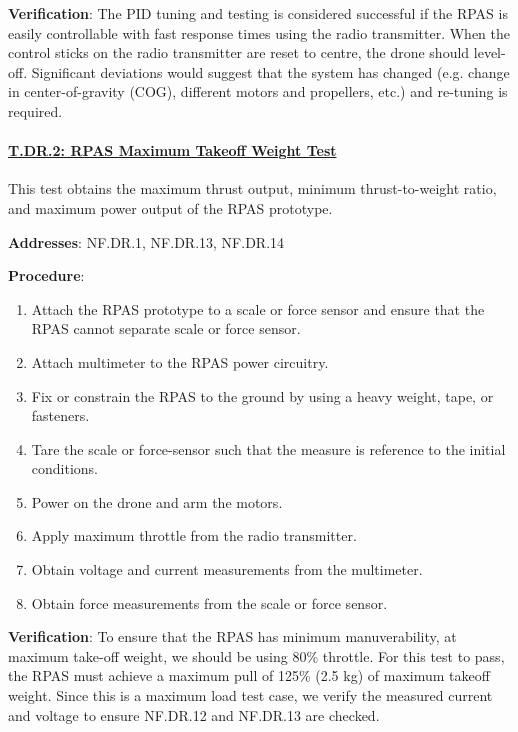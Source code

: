 \textbf{Verification}: The PID tuning and testing is considered successful if the RPAS is easily controllable with fast response times using the radio transmitter. When the control sticks on the radio transmitter are reset to centre, the drone should level-off. Significant deviations would suggest that the system has changed (e.g. change in center-of-gravity (COG), different motors and propellers, etc.) and re-tuning is required. 

% 

\paragraph{\underline{T.DR.2: RPAS Maximum Takeoff Weight Test}}

This test obtains the maximum thrust output, minimum thrust-to-weight ratio, and maximum power output of the RPAS prototype.

\textbf{Addresses}:  NF.DR.1, NF.DR.13, NF.DR.14

\textbf{Procedure}:
\begin{enumerate}[noitemsep]
    \item Attach the RPAS prototype to a scale or force sensor and ensure that the RPAS cannot separate scale or force sensor.
    \item Attach multimeter to the RPAS power circuitry.
    \item Fix or constrain the RPAS to the ground by using a heavy weight, tape, or fasteners.
    \item Tare the scale or force-sensor such that the measure is reference to the initial conditions.
    \item Power on the drone and arm the motors.
    \item Apply maximum throttle from the radio transmitter.
    \item Obtain voltage and current measurements from the multimeter.
    \item Obtain force measurements from the scale or force sensor.
\end{enumerate}

\textbf{Verification}: 
To ensure that the RPAS has minimum manuverability, at maximum take-off weight, we should be using 80\% throttle. For this test to pass, the RPAS must achieve a maximum pull of 125\% (2.5 kg) of maximum takeoff weight. Since this is a maximum load test case, we verify the measured current and voltage to ensure NF.DR.12 and NF.DR.13 are checked.

% 

